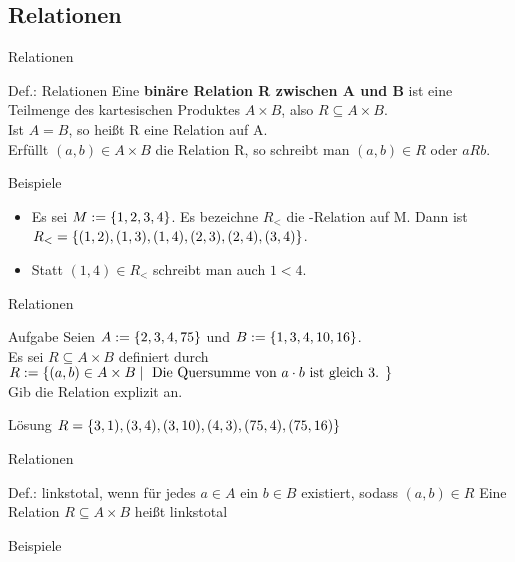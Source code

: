 \subsection{Relationen}
	\begin{frame}{Relationen}
		\begin{block}{Def.: Relationen}
			Eine \textbf{binäre Relation R zwischen A und B} ist eine Teilmenge des kartesischen Produktes $A \times B$, also $R \subseteq A \times B$.\\
			Ist $A=B$, so heißt R eine Relation auf A.\\
			Erfüllt $(a,b) \in A \times B$ die Relation R, so schreibt man $(a,b) \in R$ oder $aRb$.
		\end{block}
	
		\begin{exampleblock}{Beispiele}
			\begin{itemize}
				\item Es sei $M:=\{ 1,2,3,4 \}$. Es bezeichne $R_<$ die -Relation auf M. Dann ist $R_< = \{ (1,2),(1,3),(1,4),(2,3),(2,4),(3,4) \}$.
				\item Statt $(1,4) \in R_<$ schreibt man auch $1 < 4$.
			\end{itemize}
		\end{exampleblock}
	\end{frame}

	\begin{frame}{Relationen}
		\begin{exampleblock}{Aufgabe}
			Seien $A:=\{ 2,3,4,75 \}$ und $B:=\{ 1,3,4,10,16 \}$.\\ 
			Es sei $R \subseteq A \times B $ definiert durch $R:=\{ (a,b) \in A \times B \mid \text{ Die Quersumme von $a \cdot b$ ist gleich 3. } \}$\\
			Gib die Relation explizit an.
		\end{exampleblock}
	\pause
		\begin{block}{Lösung}		
			$R=\{ 3,1),(3,4),(3,10),(4,3),(75,4),(75,16) \}$
		\end{block}
	\end{frame}

	\begin{frame}{Relationen}
		\begin{block}{Def.: linkstotal}, wenn für jedes $a \in A$ ein $b \in B$ existiert, sodass $(a,b) \in R$
			Eine Relation $R \subseteq A \times B$ heißt linkstotal
		\end{block}
	
		\begin{exampleblock}{Beispiele}
	
		\end{exampleblock}
	\end{frame}



\section{}
\questionframe
\lastframe
